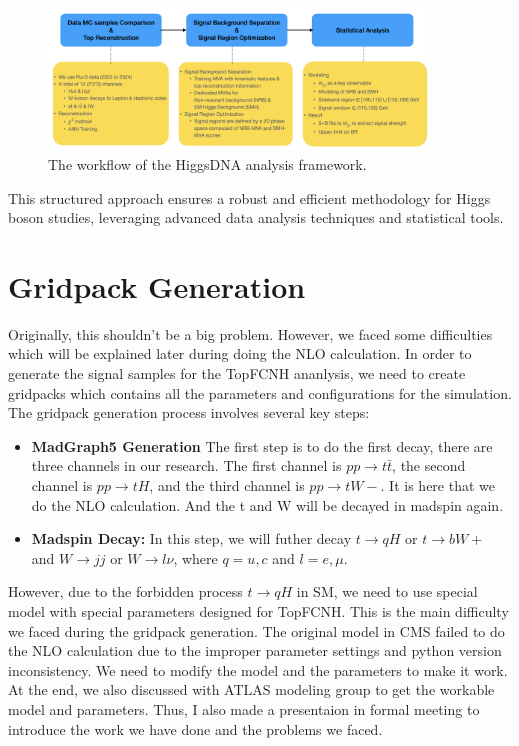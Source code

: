 \begin{figure}[htbp]
\centering
\includegraphics[width=0.9\textwidth]{Figures/workflow.png}
\caption{The workflow of the HiggsDNA analysis framework.}
\label{fig:workflow}
\end{figure}

This structured approach ensures a robust and efficient methodology for Higgs boson studies, leveraging advanced data analysis techniques and statistical tools.

\section{Gridpack Generation}

Originally, this shouldn't be a big problem. However, we faced some difficulties which will be explained later during doing the NLO calculation. In order to generate the signal samples for the TopFCNH ananlysis, we need to create gridpacks which contains all the parameters and configurations for the simulation. The gridpack generation process involves several key steps:

\begin{itemize}
\item \textbf{MadGraph5 Generation} 
The first step is to do the first decay, there are three channels in our research. The first channel is $pp \to t\bar{t}$, the second channel is $pp \to tH$, and the third channel is $pp \to tW-$. It is here that we do the NLO calculation. And the t and W will be decayed in madspin again. 
\item \textbf{Madspin Decay:} 
In this step, we will futher decay $t \to qH$ or $t \to bW+$ and $W \to j j$ or $W \to l \nu$, where $q = u, c$ and $l = e, \mu$.
\end{itemize}

However, due to the forbidden process $t \to qH$ in SM, we need to use special model with special parameters designed for TopFCNH. This is the main difficulty we faced during the gridpack generation.
The original model in CMS failed to do the NLO calculation due to the improper parameter settings and python version inconsistency. We need to modify the model and the parameters to make it work. At the end, we also discussed with ATLAS modeling group to get the workable model and parameters. Thus, I also made a presentaion in formal meeting to introduce the work we have done and the problems we faced.

